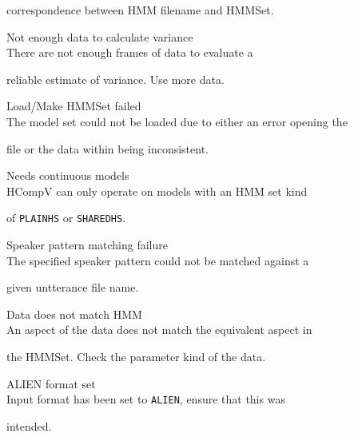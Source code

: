 \begin{itemize}
\begin{itemize}
        correspondence between HMM filename and HMMSet.





    Not enough data to calculate variance\\


        There are not enough frames of data to evaluate a


        reliable estimate of variance. Use more data.





    Load/Make HMMSet failed\\


        The model set could not be loaded due to either an error opening the


        file or the data within being inconsistent.





    Needs continuous models\\


        HCompV can only operate on models with an HMM set kind


        of \texttt{PLAINHS} or \texttt{SHAREDHS}.





    Speaker pattern matching failure\\


        The specified speaker pattern could not be matched against a


        given untterance file name.





    Data does not match HMM\\


        An aspect of the data does not match the equivalent aspect in 


        the HMMSet.  Check the parameter kind of the data.





    ALIEN format set\\


        Input format has been set to \texttt{ALIEN}, ensure that this was 


        intended.






\end{itemize}
\end{itemize}
